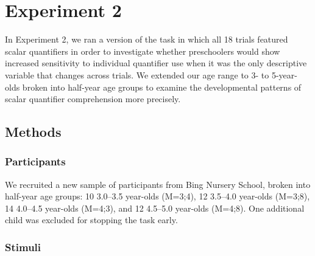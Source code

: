 \documentclass[10pt,letterpaper]{article}
\begin{document}
	


\section{Experiment 2} 


In Experiment 2, we ran a version of the task in which all 18 trials featured scalar quantifiers in order to investigate whether preschoolers would show increased sensitivity to individual quantifier use when it was the only descriptive variable that changes across trials. We extended our age range to 3- to 5-year-olds broken into half-year age groups to examine the developmental patterns of scalar quantifier comprehension more precisely. 

\subsection{Methods}

\subsubsection{Participants}

We recruited a new sample of participants from Bing Nursery School, broken into half-year age groups: 10 3.0--3.5 year-olds (M=3;4), 12 3.5--4.0 year-olds (M=3;8), 14 4.0--4.5 year-olds (M=4;3), and 12 4.5--5.0 year-olds (M=4;8).  One additional child was excluded for stopping the task early. 

\subsubsection{Stimuli}
\end{document}
